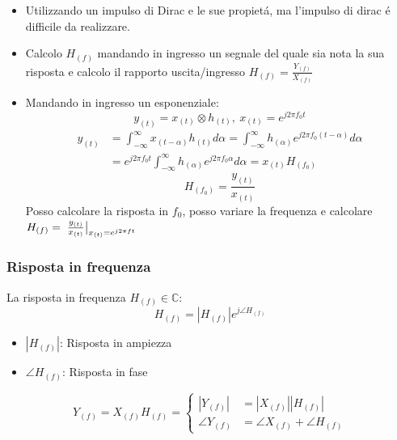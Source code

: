         \begin{itemize}
            \item {
                Utilizzando un impulso di Dirac e le sue propietá, ma l'impulso di dirac é difficile da realizzare. 
            }
            \item {
                Calcolo $H_{(f)}$ mandando in ingresso un segnale del quale sia nota la sua risposta e calcolo il rapporto uscita/ingresso 
                $H_{(f)} = \frac{Y_{(f)}}{X_{(f)}}$
            }
            \item {
                Mandando in ingresso un esponenziale:
                \[
                    y_{(t)} = x_{(t)}\otimes h_{(t)},\ x_{(t)} = e^{j2\pi f_0t}
                \]
                \begin{align}
                    y_{(t)} &= \int_{-\infty}^{\infty}x_{(t-\alpha)}h_{(t)}d\alpha = \int_{-\infty}^{\infty}h_{(\alpha)} e^{j2\pi f_0(t-\alpha)}d\alpha \nonumber \\
                            &= e^{j2\pi f_0t}\int_{-\infty}^{\infty}h_{(\alpha)} e^{j2\pi f_0\alpha}d\alpha = x_{(t)}H_{(f_0)} \nonumber 
                \end{align}
                \[
                    H_{(f_0)} = \frac{y_{(t)}}{x_{(t)}}
                \]  
                Posso calcolare la risposta in $f_0$, posso variare la frequenza e calcolare $H_{(f)} = \eval*{\frac{y_{(t)}}{x_{(t)}}}_{x_{(t)} = e^{j2\pi ft}}$
            }
        \end{itemize}
        \subsubsection{Risposta in frequenza}
            La risposta in frequenza $H_{(f)} \in \mathbb{C}$:
            \[
                H_{(f)} = |H_{(f)}| e^{j\angle H_{(f)} }
            \]  
            \begin{itemize}
                \item$|H_{(f)}|$: Risposta in ampiezza
                \item $\angle H_{(f)}$: Risposta in fase 
            \end{itemize}
            \[
                Y_{(f)} = X_{(f)} H_{(f)} = 
                \begin{cases}
                    |Y_{(f)}| &= |X_{(f)}||H_{(f)}| \nonumber \\
                    \angle Y_{(f)} &= \angle X_{(f)} + \angle H_{(f)} \nonumber
                \end{cases} 
            \]  
